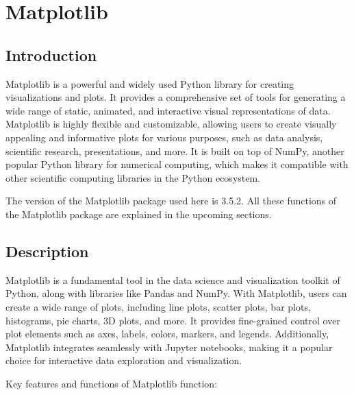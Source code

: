 %
%


\chapter{Matplotlib}


\section{Introduction}

Matplotlib is a powerful and widely used Python library for creating visualizations and plots. It provides a comprehensive set of tools for generating a wide range of static, animated, and interactive visual representations of data. Matplotlib is highly flexible and customizable, allowing users to create visually appealing and informative plots for various purposes, such as data analysis, scientific research, presentations, and more. It is built on top of NumPy, another popular Python library for numerical computing, which makes it compatible with other scientific computing libraries in the Python ecosystem.

The version of the Matplotlib package used here is 3.5.2.  All these functions of the Matplotlib package are explained in the upcoming sections.

\section{Description}

Matplotlib is a fundamental tool in the data science and visualization toolkit of Python, along with libraries like Pandas and NumPy. With Matplotlib, users can create a wide range of plots, including line plots, scatter plots, bar plots, histograms, pie charts, 3D plots, and more. It provides fine-grained control over plot elements such as axes, labels, colors, markers, and legends. Additionally, Matplotlib integrates seamlessly with Jupyter notebooks, making it a popular choice for interactive data exploration and visualization.

Key features and functions of Matplotlib function:

